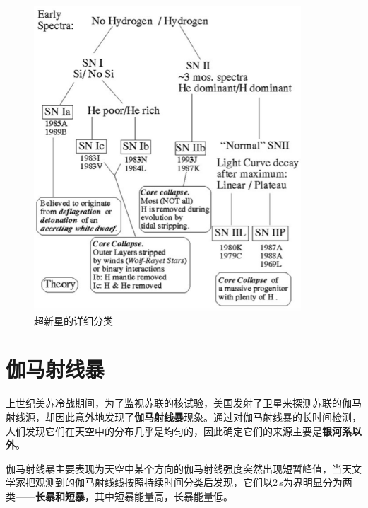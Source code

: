 \begin{figure}[hbt]
  \centering
  \includegraphics[width=10cm]{chapters/15/supernova}
  \caption{超新星的详细分类}
  \label{fig:supernova}
\end{figure}

\section{伽马射线暴}
上世纪美苏冷战期间，为了监视苏联的核试验，美国发射了卫星来探测苏联的伽马射线源，却因此意外地发现了\textbf{伽马射线暴}现象。通过对伽马射线暴的长时间检测，人们发现它们在天空中的分布几乎是均匀的，因此确定它们的来源主要是\textbf{银河系以外}。

伽马射线暴主要表现为天空中某个方向的伽马射线强度突然出现短暂峰值，当天文学家把观测到的伽马射线线按照持续时间分类后发现，它们以2\,s为界明显分为两类——\textbf{长暴和短暴}，其中短暴能量高，长暴能量低。